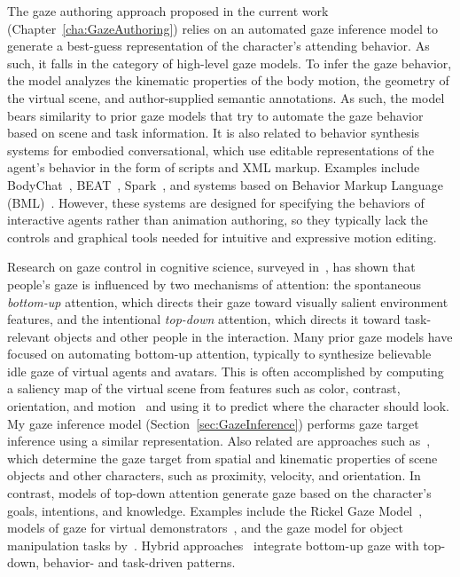 The gaze authoring approach proposed in the current work (Chapter~\ref{cha:GazeAuthoring}) relies on an automated gaze inference model to generate a best-guess representation of the character's attending behavior. As such, it falls in the category of high-level gaze models. To infer the gaze behavior, the model analyzes the kinematic properties of the body motion, the geometry of the virtual scene, and author-supplied semantic annotations. As such, the model bears similarity to prior gaze models that try to automate the gaze behavior based on scene and task information. It is also related to behavior synthesis systems for embodied conversational, which use editable representations of the agent's behavior in the form of scripts and XML markup. Examples include BodyChat~\citep{vilhjalmsson1998bodychat}, BEAT~\citep{cassell1999fully}, Spark~\citep{vilhjalmsson2004animating}, and systems based on Behavior Markup Language (BML)~\citep{vilhjalmsson2007bml}. However, these systems are designed for specifying the behaviors of interactive agents rather than animation authoring, so they typically lack the controls and graphical tools needed for intuitive and expressive motion editing.

Research on gaze control in cognitive science, surveyed in~\citep{henderson2003human}, has shown that people's gaze is influenced by two mechanisms of attention: the spontaneous \emph{bottom-up} attention, which directs their gaze toward visually salient environment features, and the intentional \emph{top-down} attention, which directs it toward task-relevant objects and other people in the interaction.
Many prior gaze models have focused on automating bottom-up attention, typically to synthesize believable idle gaze of virtual agents and avatars. This is often accomplished by computing a saliency map of the virtual scene from features such as color, contrast, orientation, and motion~\citep{peters2003bottomup,peters2008applying} and using it to predict where the character should look. My gaze inference model (Section~\ref{sec:GazeInference}) performs gaze target inference using a similar representation.
Also related are approaches such as~\citep{cafaro2009animating,grillon2009crowds,kokkinara2011modelling}, which determine the gaze target from spatial and kinematic properties of scene objects and other characters, such as proximity, velocity, and orientation. In contrast, models of top-down attention generate gaze based on the character's goals, intentions, and knowledge. Examples include the Rickel Gaze Model~\citep{lee2007rickel}, models of gaze for virtual demonstrators~\citep{huang2016planning}, and the gaze model for object manipulation tasks by~\citet{bai2012synthesis}. Hybrid approaches~\citep{khullar2001look,mitake2007reactive} integrate bottom-up gaze with top-down, behavior- and task-driven patterns.

